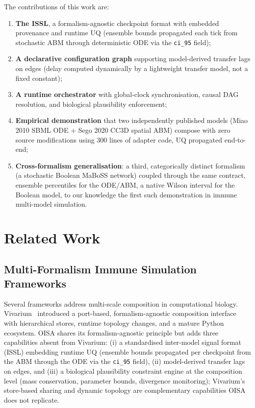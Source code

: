 \documentclass[conference,letterpaper,10pt]{IEEEtran}
\newcommand{\ttilde}{\raisebox{-0.5ex}{\textasciitilde}}
\begin{document}
\medskip\noindent The contributions of this work are:
\begin{enumerate}
  \item \textbf{The ISSL}, a formalism-agnostic checkpoint format with
        embedded provenance and runtime UQ (ensemble bounds propagated
        each tick from stochastic ABM through deterministic ODE via the
        \texttt{ci\_95} field);
  \item \textbf{A declarative configuration graph} supporting
        model-derived transfer lags on edges (delay computed dynamically
        by a lightweight transfer model, not a fixed constant);
  \item \textbf{A runtime orchestrator} with global-clock
        synchronisation, causal DAG resolution, and biological
        plausibility enforcement;
  \item \textbf{Empirical demonstration} that two independently published
        models (Miao 2010 SBML ODE + Sego 2020 CC3D spatial ABM) compose
        with zero source modifications using \ttilde{}300 lines of adapter
        code, UQ propagated end-to-end;
  \item \textbf{Cross-formalism generalisation}: a third, categorically
        distinct formalism (a stochastic Boolean MaBoSS network) coupled
        through the same contract, ensemble percentiles for the
        ODE/ABM, a native Wilson interval for the Boolean model, to
        our knowledge the first such demonstration in immune multi-model
        simulation.
\end{enumerate}

\section{Related Work}\label{sec:related}

\subsection{Multi-Formalism Immune Simulation Frameworks}
\label{sec:related-vivarium}

Several frameworks address multi-scale composition in computational
biology. Vivarium~\cite{agmon2022vivarium} introduced a port-based,
formalism-agnostic composition interface with hierarchical stores,
runtime topology changes, and a mature Python ecosystem. OISA shares
its formalism-agnostic principle but adds three capabilities absent
from Vivarium: (i) a standardised inter-model signal format (ISSL)
embedding runtime UQ (ensemble bounds propagated per checkpoint from
the ABM through the ODE via the \texttt{ci\_95} field), (ii)
model-derived transfer lags on edges, and (iii) a biological
plausibility constraint engine at the composition level (mass
conservation, parameter bounds, divergence monitoring); Vivarium's
store-based sharing and dynamic topology are complementary capabilities
OISA does not replicate.
\end{document}
